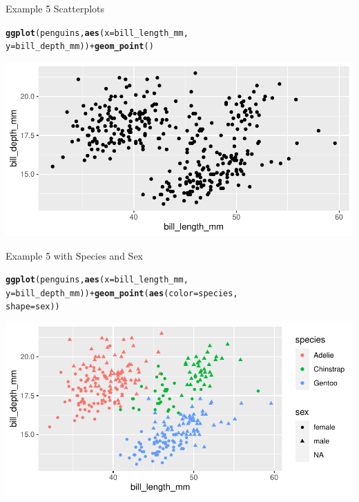 \documentclass{beamer}\usepackage[]{graphicx}\usepackage[]{color}
\makeatletter
\newcommand{\hlopt}[1]{\textcolor[rgb]{0,0,0}{#1}}%
\newcommand{\hlstd}[1]{\textcolor[rgb]{0.345,0.345,0.345}{#1}}%
\newcommand{\hlkwc}[1]{\textcolor[rgb]{0.333,0.667,0.333}{#1}}%
\newcommand{\hlkwd}[1]{\textcolor[rgb]{0.737,0.353,0.396}{\textbf{#1}}}%
\newenvironment{kframe}{%
 \def\at@end@of@kframe{}%
 \ifinner\ifhmode%
  \def\at@end@of@kframe{\end{minipage}}%
  \begin{minipage}{\columnwidth}%
 \fi\fi%
 \def\FrameCommand##1{\hskip\@totalleftmargin \hskip-\fboxsep
 \colorbox{shadecolor}{##1}\hskip-\fboxsep
     \hskip-\linewidth \hskip-\@totalleftmargin \hskip\columnwidth}%
 \MakeFramed {\advance\hsize-\width
   \@totalleftmargin\z@ \linewidth\hsize
   \@setminipage}}%
 {\par\unskip\endMakeFramed%
 \at@end@of@kframe}
\newenvironment{knitrout}{}{} %
\makeatother
\begin{document}
\begin{frame}[fragile]{Example 5 Scatterplots}
\begin{knitrout}
\color{fgcolor}\begin{kframe}
\begin{alltt}
\hlkwd{ggplot}\hlstd{(penguins,} \hlkwd{aes}\hlstd{(}\hlkwc{x} \hlstd{= bill_length_mm,}
    \hlkwc{y} \hlstd{= bill_depth_mm))} \hlopt{+} \hlkwd{geom_point}\hlstd{()}
\end{alltt}
\end{kframe}
\includegraphics[width=0.95\linewidth]{figure/unnamed-chunk-19-1} 
\end{knitrout}

\end{frame}
\begin{frame}[fragile]{Example 5 with Species and Sex}
\begin{knitrout}
\color{fgcolor}\begin{kframe}
\begin{alltt}
\hlkwd{ggplot}\hlstd{(penguins,} \hlkwd{aes}\hlstd{(}\hlkwc{x} \hlstd{= bill_length_mm,}
    \hlkwc{y} \hlstd{= bill_depth_mm))} \hlopt{+} \hlkwd{geom_point}\hlstd{(}\hlkwd{aes}\hlstd{(}\hlkwc{color} \hlstd{= species,}
    \hlkwc{shape} \hlstd{= sex))}
\end{alltt}
\end{kframe}
\includegraphics[width=0.95\linewidth]{figure/unnamed-chunk-20-1} 
\end{knitrout}

\end{frame}
\end{document}
